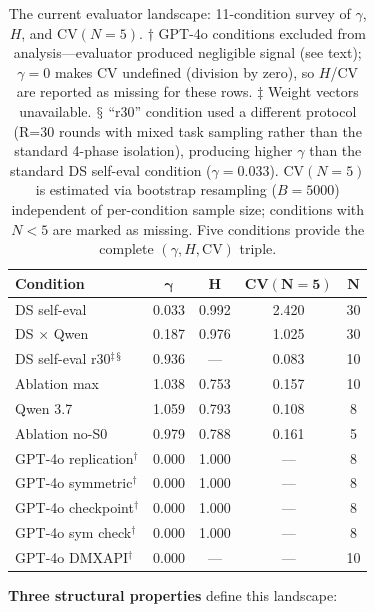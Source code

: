 \documentclass[11pt]{article}
\newcommand{\CV}{\ensuremath{\mathrm{CV}}}
\theoremstyle{definition}
\theoremstyle{remark}
\begin{document}
\begin{table}[H]
\centering
\caption{The current evaluator landscape: 11-condition survey of $\gamma$, $H$, and CV$(N{=}5)$. $\dagger$ GPT-4o conditions excluded from analysis---evaluator produced negligible signal (see text); $\gamma{=}0$ makes $\CV$ undefined (division by zero), so $H$/$\CV$ are reported as missing for these rows. $\ddagger$ Weight vectors unavailable. $\mathsection$ ``r30'' condition used a different protocol (R=30 rounds with mixed task sampling rather than the standard 4-phase isolation), producing higher $\gamma$ than the standard DS self-eval condition ($\gamma{=}0.033$). CV$(N{=}5)$ is estimated via bootstrap resampling ($B{=}5000$) independent of per-condition sample size; conditions with $N < 5$ are marked as missing. Five conditions provide the complete $(\gamma, H, \CV)$ triple.}
\label{tab:landscape_survey}
\footnotesize
\begin{tabular}{@{}lcccc@{}}
\toprule
\textbf{Condition} & $\boldsymbol{\gamma}$ & $\boldsymbol{H}$ & $\textbf{CV}\boldsymbol{(N{=}5)}$ & $\boldsymbol{N}$ \\
\midrule
DS self-eval          & 0.033 & 0.992 & 2.420 & 30 \\
DS $\times$ Qwen      & 0.187 & 0.976 & 1.025 & 30 \\
DS self-eval r30$^\ddagger$$^\mathsection$ & 0.936 & ---   & 0.083 & 10 \\
Ablation max          & 1.038 & 0.753 & 0.157 & 10 \\
Qwen 3.7              & 1.059 & 0.793 & 0.108 & 8  \\
Ablation no-S0        & 0.979 & 0.788 & 0.161 & 5  \\
\midrule
GPT-4o replication$^\dagger$   & 0.000 & 1.000 & ---   & 8  \\
GPT-4o symmetric$^\dagger$     & 0.000 & 1.000 & ---   & 8  \\
GPT-4o checkpoint$^\dagger$    & 0.000 & 1.000 & ---   & 8  \\
GPT-4o sym check$^\dagger$     & 0.000 & 1.000 & ---   & 8  \\
GPT-4o DMXAPI$^\dagger$        & 0.000 & ---   & ---   & 10 \\
\bottomrule
\end{tabular}
\end{table}

\textbf{Three structural properties} define this landscape:
\end{document}
